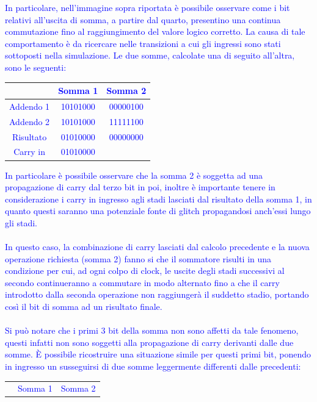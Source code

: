 \documentclass[11pt,  english, makeidx, a4paper, titlepage, oneside]{book}
\begin{document}
\textcolor{blue}{In particolare, nell'immagine sopra riportata è possibile osservare come i bit relativi all'uscita di somma, a partire dal
quarto, presentino una continua commutazione fino al raggiungimento del valore logico corretto. La causa di tale comportamento è da ricercare
nelle transizioni a cui gli ingressi sono stati sottoposti nella simulazione. Le due somme, calcolate una di seguito all'altra,
sono le seguenti:
\vspace{0.3cm}
\begin{center}
\begin{tabular}{|c|c|c|}
\hline
& Somma 1 & Somma 2 \\
\hline
Addendo 1 & 10101000 & 00000100\\
\hline
Addendo 2 & 10101000 & 11111100\\
\hline
Risultato & 01010000 & 00000000\\
\hline
Carry in & 01010000 & \\
\hline
\end{tabular}
\end{center}
\vspace{0.3cm}
In particolare è possibile osservare che la somma 2 è soggetta ad una propagazione di carry dal terzo bit in poi, inoltre è importante tenere
in considerazione i carry in ingresso agli stadi lasciati dal risultato della somma 1, in quanto questi saranno una potenziale fonte di glitch propagandosi anch'essi lungo gli stadi. \\\\
In questo caso, la combinazione di carry lasciati dal calcolo precedente e la nuova operazione richiesta (somma 2) fanno si che il sommatore risulti in una condizione per cui, ad ogni colpo di clock, le uscite degli stadi successivi al secondo continueranno a commutare in modo alternato fino a che il carry introdotto dalla seconda operazione non raggiungerà il suddetto stadio, portando così
il bit di somma ad un risultato finale. 
\\\\
Si può notare che i primi 3 bit della somma non sono affetti da tale fenomeno, questi infatti non sono soggetti alla propagazione di carry derivanti dalle due somme. È possibile ricostruire una situazione simile per questi primi bit, ponendo in ingresso un susseguirsi di due
somme leggermente differenti dalle precedenti:
\vspace{0.3cm}
\begin{center}
\begin{tabular}{|c|c|c|}
\hline
& Somma 1 & Somma 2 \\

\end{tabular}
\end{center}}
\end{document}
